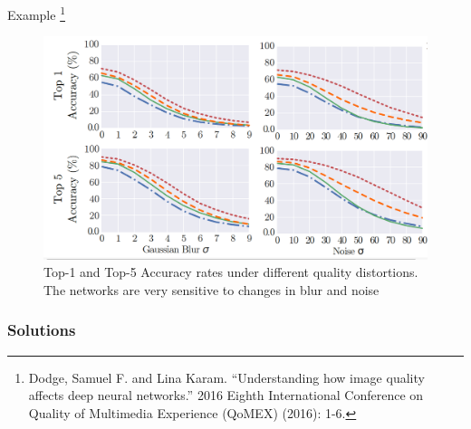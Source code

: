\documentclass{libs/ufc_format}
\newcommand{\tikzmark}[1]{\tikz[overlay,remember picture] \node (#1) {};}
\begin{document}
\begin{frame}{Example \footnote[frame]{\tiny Dodge, Samuel F. and Lina Karam. “Understanding how image quality affects deep neural networks.” 2016 Eighth International Conference on Quality of Multimedia Experience (QoMEX) (2016): 1-6.}}
    \begin{figure}
        \centering
        \includegraphics[scale=0.2]{libs/acceffect.png}
        \vspace{0.4cm}
        \caption{Top-1 and Top-5 Accuracy rates under different quality distortions. The networks are very sensitive to changes in blur and noise}
        \label{fig:challenge3}
    \end{figure}

\end{frame}


\subsubsection{Solutions}

\end{document}
